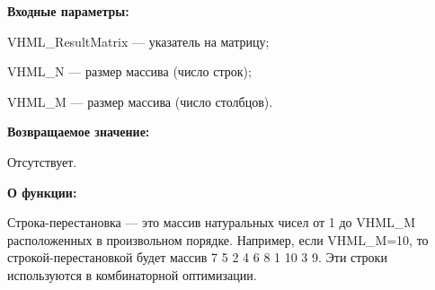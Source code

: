 \textbf{Входные параметры:}
 
 VHML\_ResultMatrix --- указатель на матрицу;
 
 VHML\_N --- размер массива (число строк);
 
 VHML\_M --- размер массива (число столбцов).

\textbf{Возвращаемое значение:} 

Отсутствует.

\textbf{О функции:}

Строка-перестановка --- это массив натуральных чисел от 1 до VHML\_M расположенных в произвольном порядке. Например, если VHML\_M=10, то строкой-перестановкой будет массив 7 5 2 4 6 8 1 10 3 9. Эти строки используются в комбинаторной оптимизации.
